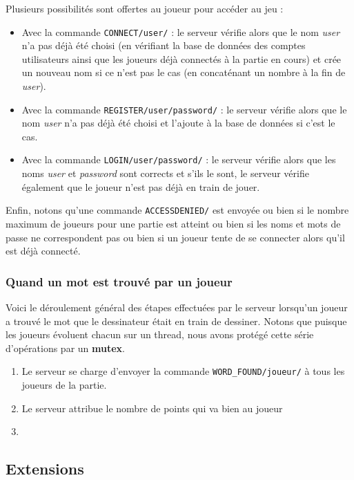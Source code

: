 \documentclass[a4paper, 11pt]{article}
\begin{document}
Plusieurs possibilités sont offertes au joueur pour accéder au jeu :
\bigskip
\begin{itemize}
\item Avec la commande \verb+CONNECT/user/+ : le serveur vérifie alors
  que le nom \textit{user} n’a pas déjà été choisi (en vérifiant la
  base de données des comptes utilisateurs ainsi que les joueurs déjà
  connectés à la partie en cours) et crée un nouveau nom si ce n’est
  pas le cas (en concaténant un nombre à la fin de \textit{user}).
\item Avec la commande \verb+REGISTER/user/password/+ : le serveur
  vérifie alors que le nom \textit{user} n’a pas déjà été choisi et
  l’ajoute à la base de données si c’est le cas.
\item Avec la commande \verb+LOGIN/user/password/+ : le serveur
  vérifie alors que les noms \textit{user} et \textit{password} sont
  corrects et s’ils le sont, le serveur vérifie également que le
  joueur n’est pas déjà en train de jouer.
\end{itemize}
\bigskip Enfin, notons qu’une commande \verb+ACCESSDENIED/+ est
envoyée ou bien si le nombre maximum de joueurs pour une partie est
atteint ou bien si les noms et mots de passe ne correspondent pas ou
bien si un joueur tente de se connecter alors qu’il est déjà connecté.

\subsubsection {Quand un mot est trouvé par un joueur}

Voici le déroulement général des étapes effectuées par le serveur
lorsqu’un joueur a trouvé le mot que le dessinateur était en train de
dessiner. Notons que puisque les joueurs évoluent chacun sur un
thread, nous avons protégé cette série d’opérations par un
\textbf{mutex}.

\begin{enumerate}
\item Le serveur se charge d’envoyer la commande
  \verb+WORD_FOUND/joueur/+ à tous les joueurs de la partie.
\item Le serveur attribue le nombre de points qui va bien au joueur
\item 
\end{enumerate}

\subsection {Extensions}
\end{document}
